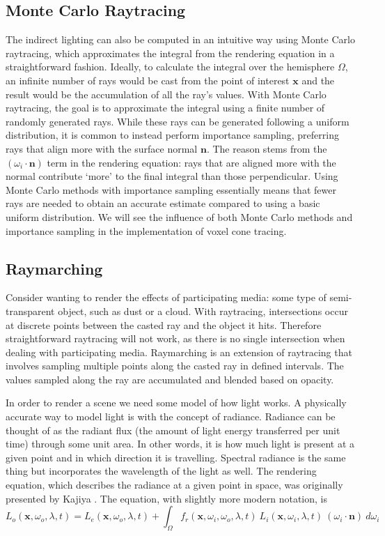 \subsection{Monte Carlo Raytracing}
The indirect lighting can also be computed in an intuitive way using Monte Carlo raytracing, which approximates the integral from the rendering equation in a straightforward fashion. Ideally, to calculate the integral over the hemisphere $\Omega$, an infinite number of rays would be cast from the point of interest $\bm{x}$ and the result would be the accumulation of all the ray's values. With Monte Carlo raytracing, the goal is to approximate the integral using a finite number of randomly generated rays. While these rays can be generated following a uniform distribution, it is common to instead perform importance sampling, preferring rays that align more with the surface normal $\bm{n}$. The reason stems from the $(\omega_i \cdot \bm{n})$ term in the rendering equation: rays that are aligned more with the normal contribute `more' to the final integral than those perpendicular. Using Monte Carlo methods with importance sampling essentially means that fewer rays are needed to obtain an accurate estimate compared to using a basic uniform distribution. We will see the influence of both Monte Carlo methods and importance sampling in the implementation of voxel cone tracing.

\subsection{Raymarching}
Consider wanting to render the effects of participating media: some type of semi-transparent object, such as dust or a cloud. With raytracing, intersections occur at discrete points between the casted ray and the object it hits. Therefore straightforward raytracing will not work, as there is no single intersection when dealing with participating media. Raymarching is an extension of raytracing that involves sampling multiple points along the casted ray in defined intervals. The values sampled along the ray are accumulated and blended based on opacity.


\iffalse
In order to render a scene we need some model of how light works. A physically accurate way to model light is with the concept of radiance. Radiance can be thought of as the radiant flux (the amount of light energy transferred per unit time) through some unit area. In other words, it is how much light is present at a given point and in which direction it is travelling. Spectral radiance is the same thing but incorporates the wavelength of the light as well. The rendering equation, which describes the radiance at a given point in space, was originally presented by Kajiya \cite{kajiya1986rendering}. The equation, with slightly more modern notation, is
\begin{equation*}
    L_o(\bm{x}, \omega_o, \lambda, t) = L_e(\bm{x}, \omega_o, \lambda, t) + \int_\Omega f_r(\bm{x}, \omega_i, \omega_o, \lambda, t)\ L_i(\bm{x}, \omega_i, \lambda, t)\ (\omega_i \cdot \bm{n})\ d\omega_i
\end{equation*}

